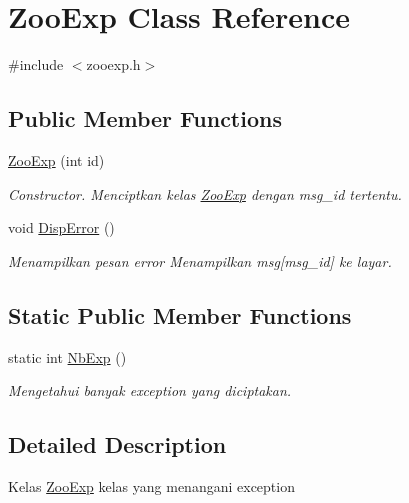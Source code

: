 \hypertarget{classZooExp}{}\section{Zoo\+Exp Class Reference}
\label{classZooExp}


{\ttfamily \#include $<$zooexp.\+h$>$}

\subsection*{Public Member Functions}
\begin{DoxyCompactItemize}
\item 
\hyperlink{classZooExp_ac5296fff1ba5b2ade9b4440d153b235c}{Zoo\+Exp} (int id)
\begin{DoxyCompactList}\small\item\em Constructor. Menciptkan kelas \hyperlink{classZooExp}{Zoo\+Exp} dengan msg\+\_\+id tertentu. \end{DoxyCompactList}\item 
void \hyperlink{classZooExp_ae84a06ad5994694168d5ce4e3e6ba3b1}{Disp\+Error} ()\hypertarget{classZooExp_ae84a06ad5994694168d5ce4e3e6ba3b1}{}\label{classZooExp_ae84a06ad5994694168d5ce4e3e6ba3b1}

\begin{DoxyCompactList}\small\item\em Menampilkan pesan error Menampilkan msg\mbox{[}msg\+\_\+id\mbox{]} ke layar. \end{DoxyCompactList}\end{DoxyCompactItemize}
\subsection*{Static Public Member Functions}
\begin{DoxyCompactItemize}
\item 
static int \hyperlink{classZooExp_ac1c2854c58be62b02ebc28dad5961eaf}{Nb\+Exp} ()
\begin{DoxyCompactList}\small\item\em Mengetahui banyak exception yang diciptakan. \end{DoxyCompactList}\end{DoxyCompactItemize}


\subsection{Detailed Description}
Kelas \hyperlink{classZooExp}{Zoo\+Exp} kelas yang menangani exception 

